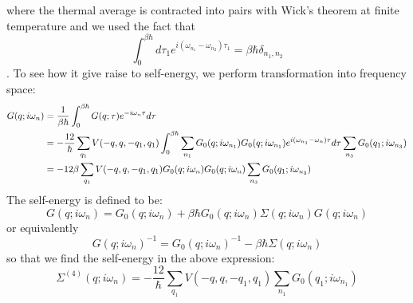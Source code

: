 \documentclass{article}
\begin{document}
where the thermal average is contracted into pairs with Wick's theorem at finite temperature and we used the fact that
\begin{equation}
    \int_0^{\beta\hbar} d\tau_1 e^{i(\omega_{n_1}-\omega_{n_2})\tau_1} = \beta\hbar \delta_{n_1,n_2}
\end{equation}.
To see how it give raise to self-energy, we perform transformation into frequency space:
\begin{align}
    G(q;i\omega_n) &= \frac{1}{\beta\hbar} \int_{0}^{\beta\hbar} G(q;\tau) e^{-i\omega_n\tau} d\tau \notag \\
        &= -\frac{12}{\hbar}\sum_{q_1} V(-q,q,-q_1,q_1) 
        \int_{0}^{\beta\hbar} \sum_{n_1} G_0(q;i\omega_{n_1}) G_0(q;i\omega_{n_1}) e^{i(\omega_{n_1}-\omega_n)\tau}  d\tau
        \sum_{n_3}G_0(q_1;i\omega_{n_3})  \notag \\
        &= -12\beta \sum_{q_1} V(-q,q,-q_1,q_1) G_0(q;i\omega_{n}) G_0(q;i\omega_{n})
        \sum_{n_3}G_0(q_1;i\omega_{n_3}) 
\end{align}
The self-energy is defined to be:
\begin{equation}
    G(q;i\omega_n) = G_0(q;i\omega_n) + \beta\hbar G_0(q;i\omega_n) \Sigma(q;i\omega_n) G(q;i\omega_n)
\end{equation}
or equivalently
\begin{equation}
    G(q;i\omega_n)^{-1} = G_0(q;i\omega_n)^{-1} - \beta\hbar \Sigma(q;i\omega_n) 
\end{equation}
so that we find the self-energy in the above expression:
\begin{equation}
    \Sigma^{(4)}(q;i\omega_n) = -\frac{12}{\hbar} \sum_{q_1} V(-q,q,-q_1,q_1) \sum_{n_1}G_0(q_1;i\omega_{n_1}) 
\end{equation}
\end{document}

